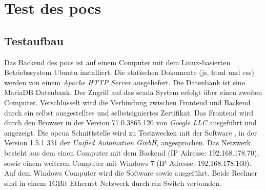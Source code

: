 \section{Test des \acp{poc} }\label{sec:poc:test}
\subsection{Testaufbau}
Das Backend des \acp{poc} ist auf einem Computer mit dem Linux-basierten Betriebssystem Ubuntu installiert. 
Die statischen Dokumente (\ac{js}, \ac{html} und \ac{css}) werden von einem \emph{Apache HTTP Server} \citep{apache} ausgeliefert.
Die Datenbank ist eine MariaDB Datenbank.
Der Zugriff auf das \ac{scada} System erfolgt über einen zweiten Computer.
Verschlüsselt wird die Verbindung zwischen Frontend und Backend durch ein selbst ausgestelltes und selbstsigniertes Zertifikat.
Das Frontend wird durch den Browser  in der Version 77.0.3865.120 von \emph{Google LLC} ausgeführt und angezeigt.
Die \ac{opcua} Schnittstelle wird zu Testzwecken mit der Software , in der Version 1.5.1 331 der \emph{Unified Automation GmbH}, angesprochen.
Das Netzwerk besteht aus dem einen Computer mit dem Backend (IP Adresse: 192.168.178.70), sowie einem weiteren Computer mit Windows 7 (IP Adresse: 192.168.178.160).
Auf dem Windows Computer wird die Software  sowie  ausgeführt.
Beide Rechner sind in einem 1GBit Ethernet Netzwerk durch ein Switch verbunden.

